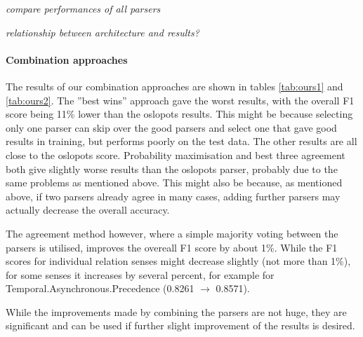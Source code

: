 \documentclass[10pt,notitlepage]{scrartcl}
\begin{document}
\textit{compare performances of all parsers}

\textit{relationship between architecture and results?}

\paragraph*{Combination approaches}

The results of our combination approaches are shown in tables \ref{tab:ours1} and \ref{tab:ours2}. The ''best wins'' approach gave the worst results, with the overall F1 score being 11\% lower than the oslopots results. This might be because selecting only one parser can skip over the good parsers and select one that gave good results in training, but performs poorly on the test data. The other results are all close to the oslopots score. Probability maximisation and best three agreement both give slightly worse results than the oslopots parser, probably due to the same problems as mentioned above. This might also be because, as mentioned above, if two parsers already agree in many cases, adding further parsers may actually decrease the overall accuracy.

The agreement method however, where a simple majority voting between the parsers is utilised, improves the overeall F1 score by about 1\%. While the F1 scores for individual relation senses might decrease slightly (not more than 1\%), for some senses it increases by several percent, for example for Temporal.Asynchronous.Precedence (0.8261 $\rightarrow$ 0.8571).

While the improvements made by combining the parsers are not huge, they are significant and can be used if further slight improvement of the results is desired.
\end{document}
